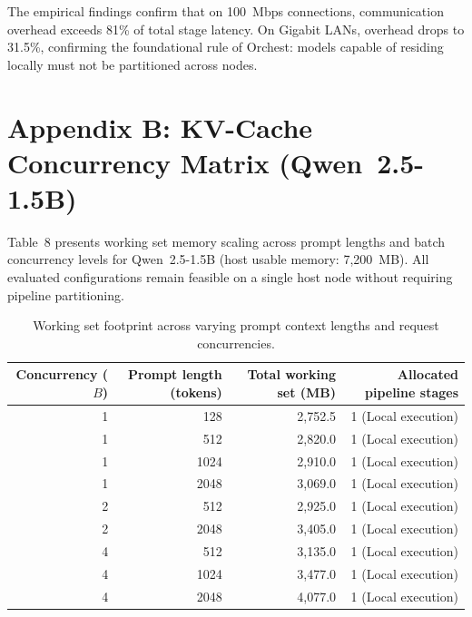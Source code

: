 \documentclass[10pt,a4paper]{article}
\begin{document}
The empirical findings confirm that on 100~Mbps connections, communication overhead exceeds 81\% of total stage latency. On Gigabit LANs, overhead drops to 31.5\%, confirming the foundational rule of Orchest: models capable of residing locally must not be partitioned across nodes.

\section*{Appendix B: KV-Cache Concurrency Matrix (Qwen~2.5-1.5B)}
Table~8 presents working set memory scaling across prompt lengths and batch concurrency levels for Qwen~2.5-1.5B (host usable memory: 7{,}200~MB). All evaluated configurations remain feasible on a single host node without requiring pipeline partitioning.

\begin{table}[H]
\centering\footnotesize
\caption{Working set footprint across varying prompt context lengths and request concurrencies.}
\begin{tabular}{@{}rrrr@{}}
\toprule
Concurrency ($B$) & Prompt length (tokens) & Total working set (MB) & Allocated pipeline stages\\
\midrule
1 & 128 & 2{,}752.5 & 1 (Local execution)\\
1 & 512 & 2{,}820.0 & 1 (Local execution)\\
1 & 1024 & 2{,}910.0 & 1 (Local execution)\\
1 & 2048 & 3{,}069.0 & 1 (Local execution)\\
2 & 512 & 2{,}925.0 & 1 (Local execution)\\
2 & 2048 & 3{,}405.0 & 1 (Local execution)\\
4 & 512 & 3{,}135.0 & 1 (Local execution)\\
4 & 1024 & 3{,}477.0 & 1 (Local execution)\\
4 & 2048 & 4{,}077.0 & 1 (Local execution)\\
\bottomrule
\end{tabular}
\end{table}
\end{document}
